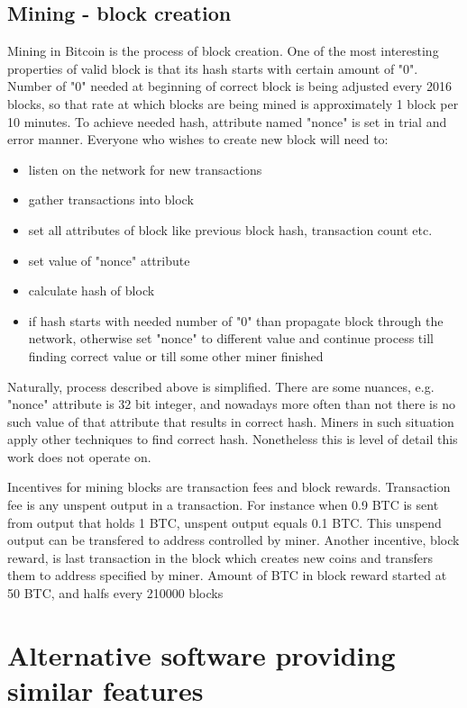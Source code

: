 \documentclass[12pt, en, eng, oneside]{mgr}
\begin{document}
\section{Mining - block creation}
Mining in Bitcoin is the process of block creation. One of the most interesting properties of valid block is that its hash starts with certain amount of "0". Number of "0" needed at beginning of correct block is being adjusted every 2016 blocks, so that rate at which blocks are being mined is approximately 1 block per 10 minutes. To achieve needed hash, attribute named "nonce" is set in trial and error manner. Everyone who wishes to create new block will need to:

\begin{itemize}
\item
listen on the network for new transactions
\item
gather transactions into block
\item
set all attributes of block like previous block hash, transaction count etc.
\item
set value of "nonce" attribute
\item
calculate hash of block
\item
if hash starts with needed number of "0" than propagate block through the network, otherwise set "nonce" to different value and continue process till finding correct value or till some other miner finished 
\end{itemize}

Naturally, process described above is simplified. There are some nuances, e.g. "nonce" attribute is 32 bit integer, and nowadays more often than not there is no such value of that attribute that results in correct hash. Miners in such situation apply other techniques to find correct hash. Nonetheless this is level of detail this work does not operate on.
 
Incentives for mining blocks are transaction fees and block rewards. Transaction fee is any unspent output in a transaction. For instance when 0.9 BTC is sent from output that holds 1 BTC, unspent output equals 0.1 BTC. This unspend output can be transfered to address controlled by miner.  
Another incentive, block reward, is last transaction in the block which creates new coins and transfers them to address specified by miner. Amount of BTC in block reward started at 50 BTC, and halfs every 210000 blocks \cite{currency-supply}


\chapter{Alternative software providing similar features}
\end{document}
